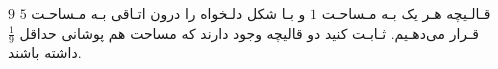 \EXERCISE
$9$
قـالـیچه هـر یک بـه مـساحـت
$1$
 و بـا شکل دلـخواه را درون اتـاقی بـه مـساحـت
$5$
 قـرار می‌دهـیم. ثـابـت کنید دو قالیچه وجود دارند که مساحت هم پوشانی حداقل
$\frac{1}{9}$
 داشته باشند.